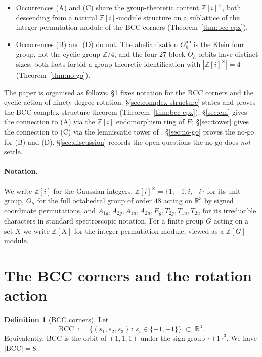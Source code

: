\documentclass[11pt,reqno]{amsart}
\theoremstyle{plain}
\theoremstyle{definition}
\newtheorem{definition}[theorem]{Definition}
\theoremstyle{remark}
\numberwithin{equation}{section}
\newcommand{\BCC}{\mathrm{BCC}}
\begin{document}
\begin{itemize}[leftmargin=*]
\item Occurrences (A) and (C) share the group-theoretic content
$\mathbb{Z}[i]^{\times}$, both descending from a natural
$\mathbb{Z}[i]$-module structure on a sublattice of the integer
permutation module of the BCC corners (Theorem~\ref{thm:bcc-cpx}).
\item Occurrences (B) and (D) do not. The abelianization
$O_{h}^{\mathrm{ab}}$ is the Klein four group, not the cyclic group
$\mathbb{Z}/4$, and the four 27-block $O_{h}$-orbits have
distinct sizes; both facts forbid a group-theoretic identification
with $|\mathbb{Z}[i]^{\times}| = 4$ (Theorem~\ref{thm:no-go}).
\end{itemize}

The paper is organised as follows. \S\ref{sec:bcc-action} fixes
notation for the BCC corners and the cyclic action of
ninety-degree rotation. \S\ref{sec:complex-structure} states and
proves the BCC complex-structure theorem (Theorem~\ref{thm:bcc-cpx}).
\S\ref{sec:cm} gives the connection to (A) via the
$\mathbb{Z}[i]$ endomorphism ring of $E$; \S\ref{sec:tower} gives the
connection to (C) via the lemniscatic tower of \cite{paper-a}.
\S\ref{sec:no-go} proves the no-go for (B) and (D).
\S\ref{sec:discussion} records the open questions the no-go does
\emph{not} settle.

\paragraph{Notation.}
We write $\mathbb{Z}[i]$ for the Gaussian integers, $\mathbb{Z}[i]^{\times} =
\{1, -1, i, -i\}$ for its unit group, $O_{h}$ for the full
octahedral group of order $48$ acting on $\mathbb{R}^{3}$ by signed
coordinate permutations, and $A_{1g}, A_{2g}, A_{1u}, A_{2u}, E_{g},
T_{2g}, T_{1u}, T_{2u}$ for its irreducible characters in standard
spectroscopic notation. For a finite group $G$ acting on a set $X$
we write $\mathbb{Z}[X]$ for the integer permutation module, viewed
as a $\mathbb{Z}[G]$-module.

\section{The BCC corners and the rotation action}
\label{sec:bcc-action}

\begin{definition}[BCC corners]
\label{def:bcc}
Let
\[
  \BCC \;:=\; \{(s_1, s_2, s_3) \,:\, s_i \in \{+1, -1\}\} \;\subset\; \mathbb{R}^{3}.
\]
Equivalently, $\BCC$ is the orbit of $(1, 1, 1)$ under the sign
group $\{\pm 1\}^{3}$. We have $|\BCC| = 8$.
\end{definition}
\end{document}
